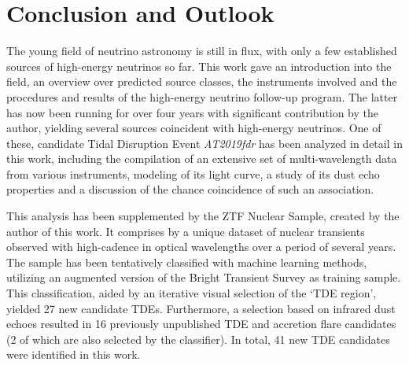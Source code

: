 \chapter*{Conclusion and Outlook}\label{conclusion}
The young field of neutrino astronomy is still in flux, with only a few established sources of high-energy neutrinos so far. This work gave an introduction into the field, an overview over predicted source classes, the instruments involved and the procedures and results of the high-energy neutrino follow-up program. The latter has now been running for over four years with significant contribution by the author, yielding several sources coincident with high-energy neutrinos. One of these, candidate Tidal Disruption Event \textit{AT2019fdr} has been analyzed in detail in this work, including the compilation of an extensive set of multi-wavelength data from various instruments, modeling of its light curve, a study of its dust echo properties and a discussion of the chance coincidence of such an association.

This analysis has been supplemented by the ZTF Nuclear Sample, created by the author of this work. It comprises by a unique dataset of nuclear transients observed with high-cadence in optical wavelengths over a period of several years. The sample has been tentatively classified with machine learning methods, utilizing an augmented version of the Bright Transient Survey as training sample. This classification, aided by an iterative visual selection of the `TDE region', yielded 27 new candidate TDEs. Furthermore, a selection based on infrared dust echoes resulted in 16 previously unpublished TDE and accretion flare candidates (2 of which are also selected by the classifier). In total, 41 new TDE candidates were identified in this work.


